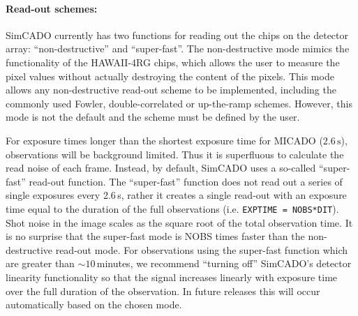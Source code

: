 \paragraph{Read-out schemes:} SimCADO currently has two functions for reading out the chips on the detector array: ``non-destructive'' and ``super-fast''. The non-destructive mode mimics the functionality of the HAWAII-4RG chips, which allows the user to measure the pixel values without actually destroying the content of the pixels. This mode allows any non-destructive read-out scheme to be implemented, including the commonly used Fowler, double-correlated or up-the-ramp schemes. However, this mode is not the default and the scheme must be defined by the user.

For exposure times longer than the shortest exposure time for MICADO ($2.6\,\mathrm{s}$), observations will be background limited. Thus it is superfluous to calculate the read noise of each frame. Instead, by default, SimCADO uses a so-called ``super-fast'' read-out function. The ``super-fast'' function does not read out a series of single exposures every 2.6\,s, rather it creates a single read-out with an exposure time equal to the duration of the full observations (i.e. \verb+EXPTIME = NOBS*DIT+). Shot noise in the image scales as the square root of the total observation time. It is no surprise that the super-fast mode is NOBS times faster than the non-destructive read-out mode. For observations using the super-fast function which are greater than $\sim 10$\,minutes, we recommend ``turning off'' SimCADO's detector linearity functionality so that the signal increases linearly with exposure time over the full duration of the observation. In future releases this will occur automatically based on the chosen mode.




